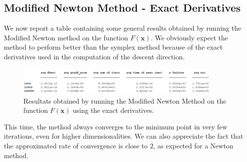 \medskip
\subsection*{Modified Newton Method - Exact Derivatives}
We now report a table containing some general results obtained by running the Modified Newton method on the function $F(\mathbf{x})$.
We obviously expect the method to perform better than the symplex method because of the exact derivatives used in the computation of the descent direction.

\begin{figure}[htbp]
    \centering
    \includegraphics[width = 0.9\textwidth]{img/pb76_table_MN.png}
    \caption{Resultats obtained by running the Modified Newton Method on the function $F(\mathbf{x})$ using the exact derivatives.}
\end{figure}

This time, the method always converges to the minimum point in very few iterations, even for higher dimensionalities. 
We can also appreciate the fact that the approximated rate of convergence is close to $2$, as expected for a Newton method.

